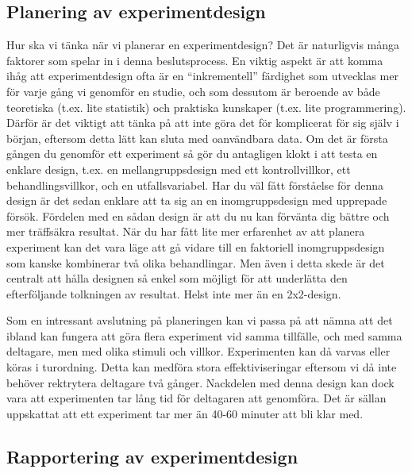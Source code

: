\documentclass[
]{book}
\begin{document}
\hypertarget{sub07.5.10}{%
\subsection{Planering av experimentdesign}\label{sub07.5.10}}

Hur ska vi tänka när vi planerar en experimentdesign? Det är naturligvis många faktorer som spelar in i denna beslutsprocess. En viktig aspekt är att komma ihåg att experimentdesign ofta är en ``inkrementell'' färdighet som utvecklas mer för varje gång vi genomför en studie, och som dessutom är beroende av både teoretiska (t.ex. lite statistik) och praktiska kunskaper (t.ex. lite programmering). Därför är det viktigt att tänka på att inte göra det för komplicerat för sig själv i början, eftersom detta lätt kan sluta med oanvändbara data. Om det är första gången du genomför ett experiment så gör du antagligen klokt i att testa en enklare design, t.ex. en mellangruppsdesign med ett kontrollvillkor, ett behandlingsvillkor, och en utfallsvariabel. Har du väl fått förståelse för denna design är det sedan enklare att ta sig an en inomgruppsdesign med upprepade försök. Fördelen med en sådan design är att du nu kan förvänta dig bättre och mer träffsäkra resultat. När du har fått lite mer erfarenhet av att planera experiment kan det vara läge att gå vidare till en faktoriell inomgruppsdesign som kanske kombinerar två olika behandlingar. Men även i detta skede är det centralt att hålla designen så enkel som möjligt för att underlätta den efterföljande tolkningen av resultat. Helst inte mer än en 2x2-design.

Som en intressant avslutning på planeringen kan vi passa på att nämna att det ibland kan fungera att göra flera experiment vid samma tillfälle, och med samma deltagare, men med olika stimuli och villkor. Experimenten kan då varvas eller köras i turordning. Detta kan medföra stora effektiviseringar eftersom vi då inte behöver rektrytera deltagare två gånger. Nackdelen med denna design kan dock vara att experimenten tar lång tid för deltagaren att genomföra. Det är sällan uppskattat att ett experiment tar mer än 40-60 minuter att bli klar med.

\hypertarget{sub07.5.11}{%
\subsection{Rapportering av experimentdesign}\label{sub07.5.11}}
\end{document}

